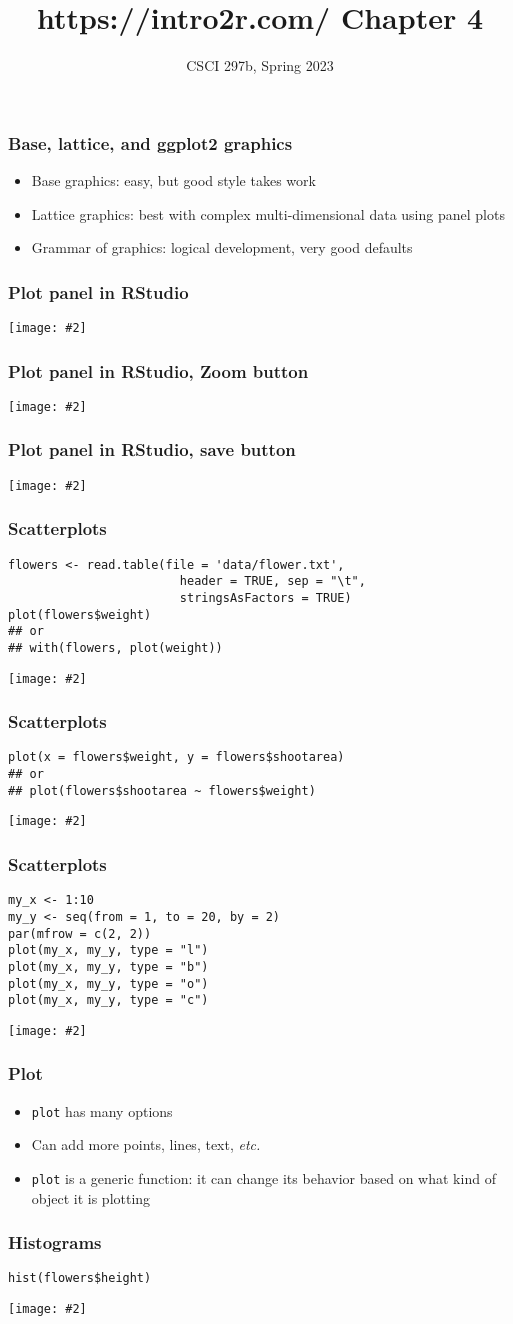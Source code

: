 \documentclass{beamer}
\title{{https://intro2r.com/} Chapter 4}
\author{CSCI 297b, Spring 2023}
\newcommand{\lsting}[1]{\begin{lstlisting}[basicstyle=#1]}
\newcommand{\bi}{\begin{itemize}}
\newcommand{\li}{\item}
\newcommand{\ei}{\end{itemize}}
\newcommand{\fig}[2]{\centerline{\texttt{[image: \#2]}}}
\newcommand{\bfr}[1]{\begin{frame}[fragile]\frametitle{{ #1 }}}
\begin{document}
\begin{frame}
\maketitle
\end{frame}

\bfr{Base, lattice, and ggplot2 graphics}

\bi
\li Base graphics:  easy, but good style takes work
\li Lattice graphics:  best with complex multi-dimensional data using panel plots
\li Grammar of graphics:  logical development, very good defaults
\ei
\end{frame}

\bfr{Plot panel in RStudio}
\fig{1}{bg_plots1}
\end{frame}

\bfr{Plot panel in RStudio, Zoom button}
\fig{1}{bg_plots2}
\end{frame}

\bfr{Plot panel in RStudio, save button}
\fig{1}{bg_plots3.png}
\end{frame}

\bfr{Scatterplots}
\lsting{\scriptsize}
flowers <- read.table(file = 'data/flower.txt', 
                        header = TRUE, sep = "\t", 
                        stringsAsFactors = TRUE)
plot(flowers$weight)
## or
## with(flowers, plot(weight)) 
\end{lstlisting}
\fig{.8}{plot1-1}
\end{frame}

\bfr{Scatterplots}
\lsting{\scriptsize}
plot(x = flowers$weight, y = flowers$shootarea)
## or
## plot(flowers$shootarea ~ flowers$weight)
\end{lstlisting}
\fig{.8}{plot4-1.png}
\end{frame}

\bfr{Scatterplots}
\lsting{\scriptsize}
my_x <- 1:10
my_y <- seq(from = 1, to = 20, by = 2)
par(mfrow = c(2, 2))
plot(my_x, my_y, type = "l")
plot(my_x, my_y, type = "b")
plot(my_x, my_y, type = "o")
plot(my_x, my_y, type = "c")
\end{lstlisting}
\fig{.6}{plot6-1.png}
\end{frame}

\bfr{Plot}
\bi
\li {\tt plot} has many options 
\li Can add more points, lines, text, {\em etc.}
\li {\tt plot} is a generic function:  it can change its behavior based
on what kind of object it is plotting
\ei
\end{frame}


\bfr{Histograms}
\lsting{\scriptsize}
hist(flowers$height)
\end{lstlisting}
\fig{.8}{plot7-1.png}
\end{frame}
\end{document}
